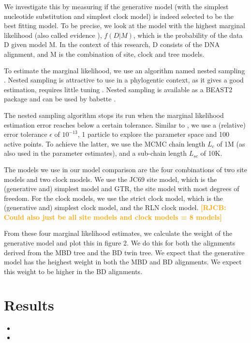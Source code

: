\documentclass{article}
\newcommand*\richel[1]{\textcolor{orange}{\textbf{[RJCB: #1]}}}
\begin{document}
\begin{itemize}
We investigate this by measuring if the generative model (with the simplest
nucleotide substitution and simplest clock model) is indeed selected 
to be the best fitting model. 
To be precise, we look at the model 
with the highest marginal likelihood 
(also called evidence \cite{mackay2003information}),
$f(D|M)$, which is the probability of the data D given model M.
In the context of this research, D consists of the DNA alignment,
and M is the combination of site, clock and tree models.

To estimate the marginal likelihood, 
we use an algorithm named nested sampling \cite{skilling2006nested}.
Nested sampling is attractive to use
in a phylogentic context, as it gives a good estimation,
requires little tuning \cite{maturana2018}.
Nested sampling is available as a BEAST2 package
and can be used by babette \cite{babette}.

The nested sampling algorithm stops its run 
when the marginal likelihood estimation error 
reaches below a certain tolerance.  
Similar to \cite{maturana2018},
we use a (relative) error tolerance $\epsilon$ of $10^{-13}$,
1 particle to explore the parameter space
and 100 active points. 
To achieve the latter, we use the MCMC chain length $L_c$ of 1M 
(as also used in the parameter estimates),
and a sub-chain length $L_{sc}$ of 10K.

The models we use in our model comparison are the four combinations
of two site models and two clock models. We use the JC69 site model, which
is the (generative and) simplest model and GTR, the site model with most
degrees of freedom. For the clock models, we use the strict clock model,
which is the (generative and) simplest clock model, and the RLN clock model.
\richel{Could also just be all site models and clock models = 8 models}

From these four marginal likelihood estimates, we calculate the weight of
the generative model and plot this in figure 2. We do this for both the 
alignments derived from the MBD tree and the BD twin tree. We expect that
the generative model has the heighest weight in both the MBD and BD alignments.
We expect this weight to be higher in the BD alignments.

\end{itemize}

\section{Results}
\begin{itemize}

\item

\item

\end{itemize}
\end{document}
